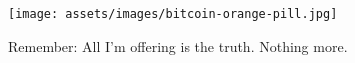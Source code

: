 \begin{figure}
  \texttt{[image: assets/images/bitcoin-orange-pill.jpg]}
  \caption*{Remember: All I'm offering is the truth. Nothing more.}
  \label{fig:bitcoin-orange-pill}
\end{figure}

%
%
%
